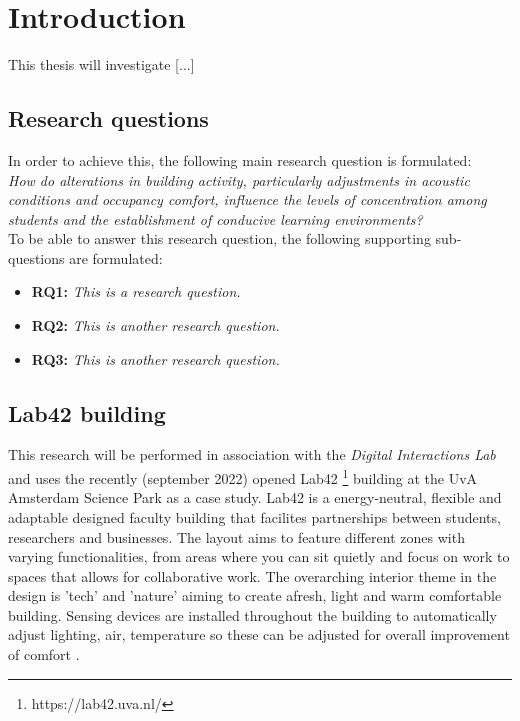 \section{Introduction}

This thesis will investigate [...] 

\subsection{Research questions}

In order to achieve this, the following main research question is formulated: \\

\emph{How do alterations in building activity, particularly adjustments in acoustic conditions and occupancy comfort, influence the levels of concentration among students and the establishment of conducive learning environments?} \\

To be able to answer this research question, the following supporting sub-questions are formulated:

\begin{itemize}
    \item \textbf{RQ1:} \emph{This is a research question.}
    \item \textbf{RQ2:} \emph{This is another research question.}
    \item \textbf{RQ3:} \emph{This is another research question.}
\end{itemize}

\subsection{Lab42 building}

This research will be performed in association with the \emph{Digital Interactions Lab} and uses the recently (september 2022) opened Lab42 \footnote{https://lab42.uva.nl/} building at the UvA Amsterdam Science Park as a case study. Lab42 is a energy-neutral, flexible and adaptable designed faculty building that facilites partnerships between students, researchers and businesses. \cite{crouwel} The layout aims to feature different zones with varying functionalities, from areas where you can sit quietly and focus on work to spaces that allows for collaborative work. The overarching interior theme in the design is 'tech' and 'nature' aiming to create afresh, light and warm comfortable building. Sensing devices are installed throughout the building to automatically adjust lighting, air, temperature so these can be adjusted for overall improvement of comfort \cite{faculty}.
